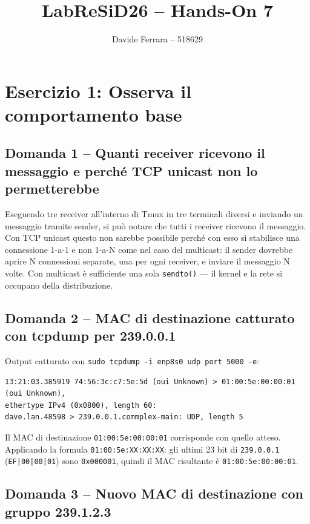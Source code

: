 \documentclass[a4paper,12pt]{article}
\title{LabReSiD26 -- Hands-On 7}
\author{Davide Ferrara -- 518629}
\date{}
\begin{document}
\maketitle

\section{Esercizio 1: Osserva il comportamento base}

\subsection*{Domanda 1 -- Quanti receiver ricevono il messaggio e perché TCP unicast non lo permetterebbe}

Eseguendo tre receiver all'interno di Tmux in tre terminali diversi e inviando un
messaggio tramite sender, si può notare che tutti i receiver ricevono il messaggio.
Con TCP unicast questo non sarebbe possibile perché con esso si stabilisce una
connessione 1-a-1 e non 1-a-N come nel caso del multicast: il sender dovrebbe aprire
N connessioni separate, una per ogni receiver, e inviare il messaggio N volte.
Con multicast è sufficiente una sola \texttt{sendto()} — il kernel e la rete si
occupano della distribuzione.

\subsection*{Domanda 2 -- MAC di destinazione catturato con tcpdump per 239.0.0.1}

Output catturato con \texttt{sudo tcpdump -i enp8s0 udp port 5000 -e}:

\begin{lstlisting}
13:21:03.385919 74:56:3c:c7:5e:5d (oui Unknown) > 01:00:5e:00:00:01 (oui Unknown),
ethertype IPv4 (0x0800), length 60:
dave.lan.48598 > 239.0.0.1.commplex-main: UDP, length 5
\end{lstlisting}

Il MAC di destinazione \texttt{01:00:5e:00:00:01} corrisponde con quello atteso.
Applicando la formula \texttt{01:00:5e:XX:XX:XX}: gli ultimi 23 bit di \texttt{239.0.0.1}
(\texttt{EF|00|00|01}) sono \texttt{0x000001}, quindi il MAC risultante è
\texttt{01:00:5e:00:00:01}.

\subsection*{Domanda 3 -- Nuovo MAC di destinazione con gruppo 239.1.2.3}
\end{document}
